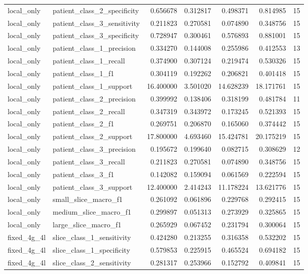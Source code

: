 \begin{tabular}{llrrrrr}
local_only & patient_class_2_specificity & 0.656678 & 0.312817 & 0.498371 & 0.814985 & 15 \\
local_only & patient_class_3_sensitivity & 0.211823 & 0.270581 & 0.074890 & 0.348756 & 15 \\
local_only & patient_class_3_specificity & 0.728947 & 0.300461 & 0.576893 & 0.881001 & 15 \\
local_only & patient_class_1_precision & 0.334270 & 0.144008 & 0.255986 & 0.412553 & 13 \\
local_only & patient_class_1_recall & 0.374900 & 0.307124 & 0.219474 & 0.530326 & 15 \\
local_only & patient_class_1_f1 & 0.304119 & 0.192262 & 0.206821 & 0.401418 & 15 \\
local_only & patient_class_1_support & 16.400000 & 3.501020 & 14.628239 & 18.171761 & 15 \\
local_only & patient_class_2_precision & 0.399992 & 0.138406 & 0.318199 & 0.481784 & 11 \\
local_only & patient_class_2_recall & 0.347319 & 0.343972 & 0.173245 & 0.521393 & 15 \\
local_only & patient_class_2_f1 & 0.269751 & 0.206870 & 0.165060 & 0.374442 & 15 \\
local_only & patient_class_2_support & 17.800000 & 4.693460 & 15.424781 & 20.175219 & 15 \\
local_only & patient_class_3_precision & 0.195672 & 0.199640 & 0.082715 & 0.308629 & 12 \\
local_only & patient_class_3_recall & 0.211823 & 0.270581 & 0.074890 & 0.348756 & 15 \\
local_only & patient_class_3_f1 & 0.142082 & 0.159094 & 0.061569 & 0.222594 & 15 \\
local_only & patient_class_3_support & 12.400000 & 2.414243 & 11.178224 & 13.621776 & 15 \\
local_only & small_slice_macro_f1 & 0.261092 & 0.061896 & 0.229768 & 0.292415 & 15 \\
local_only & medium_slice_macro_f1 & 0.299897 & 0.051313 & 0.273929 & 0.325865 & 15 \\
local_only & large_slice_macro_f1 & 0.265929 & 0.067452 & 0.231794 & 0.300064 & 15 \\
fixed_4g_4l & slice_class_1_sensitivity & 0.424280 & 0.213255 & 0.316358 & 0.532202 & 15 \\
fixed_4g_4l & slice_class_1_specificity & 0.579853 & 0.225915 & 0.465524 & 0.694182 & 15 \\
fixed_4g_4l & slice_class_2_sensitivity & 0.281317 & 0.253966 & 0.152792 & 0.409841 & 15 \\

\end{tabular}
